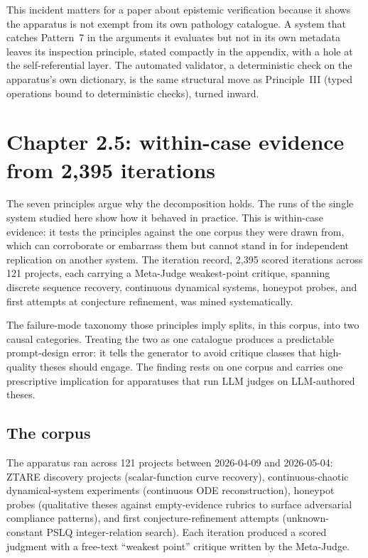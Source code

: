 \documentclass[
  11pt,
]{article}
\begin{document}
This incident matters for a paper about epistemic verification because it
shows the apparatus is not exempt from its own pathology catalogue. A
system that catches Pattern~7 in the arguments it
evaluates but not in its own metadata leaves its
inspection principle, stated compactly in the appendix, with a hole at the
self-referential layer. The automated validator, a deterministic check
on the apparatus's own dictionary, is the same structural move as
Principle~III (typed operations bound to deterministic checks), turned
inward.

\section{Chapter 2.5: within-case evidence from 2,395
iterations}\label{chapter-2.5-an-empirical-check-across-1825-iterations}

The seven principles argue why the decomposition holds. The runs of the
single system studied here show how it behaved in practice. This is
within-case evidence: it tests the principles against the one corpus they
were drawn from, which can corroborate or embarrass them but cannot stand
in for independent replication on another system. The iteration record, 2,395 scored iterations across 121 projects, each carrying a Meta-Judge
weakest-point critique, spanning discrete sequence recovery, continuous
dynamical systems, honeypot probes, and first attempts at conjecture
refinement, was mined systematically.

The failure-mode taxonomy those principles imply splits, in this corpus,
into two causal categories. Treating the two as one catalogue produces a
predictable prompt-design error: it tells the generator to avoid critique
classes that high-quality theses should engage. The finding rests on one
corpus and carries one prescriptive implication for apparatuses that run
LLM judges on LLM-authored theses.

\subsection{The corpus}\label{the-corpus}

The apparatus ran across 121 projects between 2026-04-09 and 2026-05-04:
ZTARE discovery projects (scalar-function curve recovery),
continuous-chaotic dynamical-system experiments (continuous ODE
reconstruction), honeypot probes (qualitative theses against
empty-evidence rubrics to surface adversarial compliance patterns), and
first conjecture-refinement attempts (unknown-constant PSLQ
integer-relation search). Each iteration produced a scored judgment with a
free-text ``weakest point'' critique written by the Meta-Judge.
\end{document}
